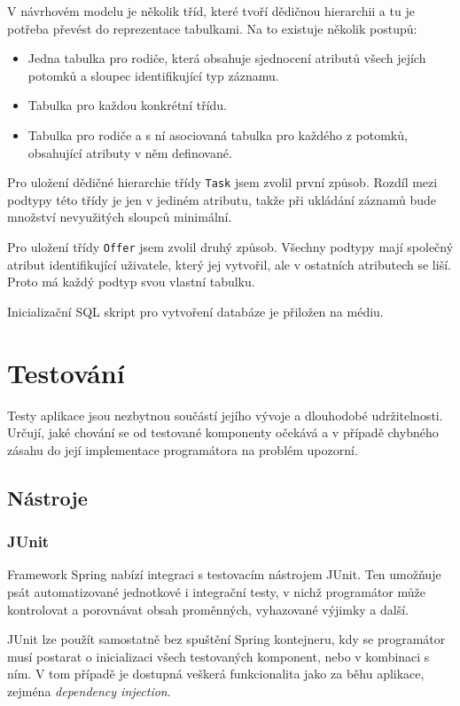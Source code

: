 \documentclass[thesis=B,czech]{FITthesis}[2012/06/26]
\begin{document}
		V návrhovém modelu je několik tříd, které tvoří dědičnou hierarchii a tu je potřeba převést do reprezentace tabulkami. Na to existuje několik postupů:
		\begin{itemize}
			\item Jedna tabulka pro rodiče, která obsahuje sjednocení atributů všech jejích potomků a sloupec identifikující typ záznamu.
			\item Tabulka pro každou konkrétní třídu.
			\item Tabulka pro rodiče a s ní asociovaná tabulka pro každého z potomků, obsahující atributy v něm definované.
		\end{itemize}
		
		Pro uložení dědičné hierarchie třídy \texttt{Task} jsem zvolil první způsob. Rozdíl mezi podtypy této třídy je jen v jediném atributu, takže při ukládání záznamů bude množství nevyužitých sloupců minimální.
		
		Pro uložení třídy \texttt{Offer} jsem zvolil druhý způsob. Všechny podtypy mají společný atribut identifikující uživatele, který jej vytvořil, ale v ostatních atributech se liší. Proto má každý podtyp svou vlastní tabulku.
		
		Inicializační SQL skript pro vytvoření databáze je přiložen na médiu.
	
	\section{Testování}
		\label{sec:testing-theory}
		Testy aplikace jsou nezbytnou součástí jejího vývoje a dlouhodobé udržitelnosti. Určují, jaké chování se od testované komponenty očekává a v případě chybného zásahu do její implementace programátora na problém upozorní. 
		
		\subsection{Nástroje}
			\subsubsection{JUnit}
			Framework Spring nabízí integraci s testovacím nástrojem JUnit. \cite{junit} Ten umožňuje psát automatizované jednotkové i integrační testy, v nichž programátor může kontrolovat a porovnávat obsah proměnných, vyhazované výjimky a další.
			
			JUnit lze použít samostatně bez spuštění Spring kontejneru, kdy se programátor musí postarat o inicializaci všech testovaných komponent, nebo v kombinaci s ním. V tom případě je dostupná veškerá funkcionalita jako za běhu aplikace, zejména \textit{dependency injection}.
			
\end{document}
